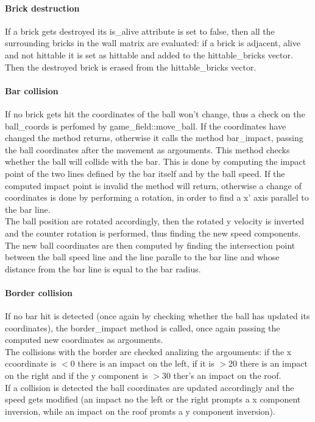 \documentclass[]{article}
\begin{document}
\paragraph{Brick destruction}
If a brick gets destroyed its is\_alive attribute is set to false, then all the surrounding bricks in the wall matrix are evaluated: if a brick is adjacent, alive and not hittable it is set as hittable and added to the hittable\_bricks vector.
Then the destroyed brick is erased from the hittable\_bricks vector.
\paragraph{Bar collision}
If no brick gets hit the coordinates of the ball won't change, thus a check on the ball\_coords is perfomed by game\_field::move\_ball. 
If the coordinates have changed the method returns, otherwise it calls the method bar\_impact, passing the ball coordinates after the movement as argouments. This method checks 
whether the ball will collide with the bar. This is done by computing the impact point of the two lines defined by the bar itself and by the ball speed.
If the computed impact point is invalid the method will return, otherwise a change of coordinates is done by performing a rotation, in order to find a x' axis parallel to the bar line.\\
The ball position are rotated accordingly, then the rotated y velocity is inverted and the counter rotation is performed, thus finding the new speed components.\\
The new ball coordinates are then computed by finding the intersection point between the ball speed line and the line paralle to the bar line and whose distance from the bar line is equal to the bar radius.\\

\paragraph{Border collision}
If no bar hit is detected (once again by checking whether the ball has updated its coordinates), the border\_impact method is called, once again passing the computed new coordinates as argouments.\\
The collisions with the border are checked analizing the argouments: if the x ccoordinate is $<$0 there is an impact on the left, if it is $>$20 there is an impact on the right and if the y component is $>$30 ther's an impact on the roof. \\
If a collision is detected the ball coordinates are updated accordingly and the speed gets modified (an impact no the left or the right prompts a x component inversion, while an impact on the roof promts a y component inversion).
\end{document}
